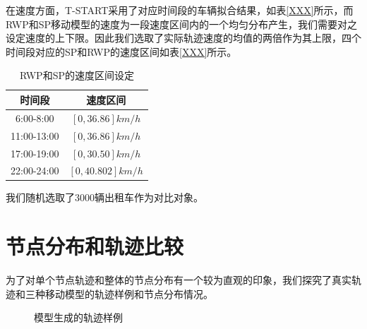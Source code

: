 在速度方面，T-START采用了对应时间段的车辆拟合结果，如表\ref{XXX}所示，而RWP和SP移动模型的速度为一段速度区间内的一个均匀分布产生，我们需要对之设定速度的上下限。因此我们选取了实际轨迹速度的均值的两倍作为其上限，四个时间段对应的SP和RWP的速度区间如表\ref{XXX}所示。
\begin{table}
\centering
\caption{RWP和SP的速度区间设定}
\begin{tabular}{cc}
\hline
\hline
  时间段& 速度区间 \\
  \hline
6:00-8:00  & $[0, 36.86]km/h$ \\
11:00-13:00  &  $[0, 36.86]km/h$\\
17:00-19:00 &  $[0, 30.50]km/h$\\
22:00-24:00  & $[0, 40.802]km/h$\\
\hline
\end{tabular}
\end{table}
我们随机选取了3000辆出租车作为对比对象。

\section{节点分布和轨迹比较}

为了对单个节点轨迹和整体的节点分布有一个较为直观的印象，我们探究了真实轨迹和三种移动模型的轨迹样例和节点分布情况。
\begin{figure}[ht]
\centering
{}
\caption{模型生成的轨迹样例}\label{figure_tracesample}
\end{figure}

